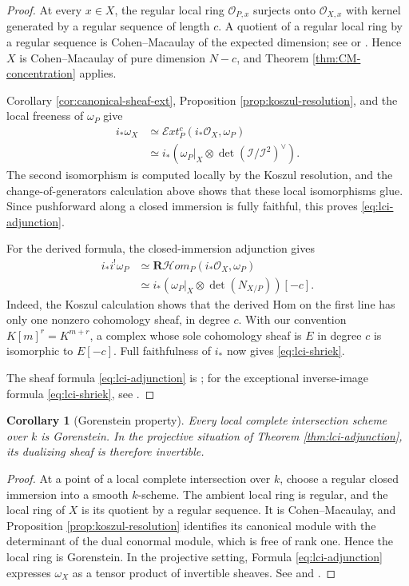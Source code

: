 \documentclass[11pt,a4paper]{article}
\newtheorem{corollary}[theorem]{Corollary}
\theoremstyle{definition}
\theoremstyle{remark}
\newcommand{\OO}{\mathcal O}
\newcommand{\II}{\mathcal I}
\newcommand{\shExt}{\mathcal E\!xt}
\newcommand{\RshHom}{\mathbf R\!\mathcal H\!om}
\newcommand{\dual}{^{\vee}}
\newcommand{\determinant}{\operatorname{det}}
\begin{document}
\begin{proof}
At every $x\in X$, the regular local ring $\OO_{P,x}$ surjects onto
$\OO_{X,x}$ with kernel generated by a regular sequence of length $c$. A
quotient of a regular local ring by a regular sequence is Cohen--Macaulay of
the expected dimension; see
\cite[Chapter II, Theorem 8.21A(a), (c), and (d)]{HartshorneAG} or
\cite[Theorem 2.1.3]{BrunsHerzog}. Hence $X$ is Cohen--Macaulay of pure
dimension $N-c$, and Theorem
\ref{thm:CM-concentration} applies.

Corollary \ref{cor:canonical-sheaf-ext}, Proposition
\ref{prop:koszul-resolution}, and the local freeness of $\omega_P$ give
\begin{align*}
  i_*\omega_X
  &\simeq\shExt_P^c(i_*\OO_X,\omega_P)\\
  &\simeq
  i_*\!\left(
    \omega_P|_X\otimes\determinant(\II/\II^2)\dual
  \right).
\end{align*}
The second isomorphism is computed locally by the Koszul resolution, and the
change-of-generators calculation above shows that these local isomorphisms
glue. Since pushforward along a closed immersion is fully faithful, this
proves \eqref{eq:lci-adjunction}.

For the derived formula, the closed-immersion adjunction gives
\begin{align*}
  i_*i^!\omega_P
  &\simeq\RshHom_P(i_*\OO_X,\omega_P)\\
  &\simeq
  i_*\!\left(
    \omega_P|_X\otimes\determinant(N_{X/P})
  \right)[-c].
\end{align*}
Indeed, the Koszul calculation shows that the derived Hom on the first line
has only one nonzero cohomology sheaf, in degree $c$. With our convention
$K[m]^r=K^{m+r}$, a complex whose sole cohomology sheaf is $E$ in degree $c$
is isomorphic to $E[-c]$. Full faithfulness of $i_*$ now gives
\eqref{eq:lci-shriek}.

The sheaf formula \eqref{eq:lci-adjunction} is
\cite[Chapter III, Theorem 7.11]{HartshorneAG}; for the exceptional
inverse-image formula \eqref{eq:lci-shriek}, see \cite[Tag 0BR0]{Stacks}.
\end{proof}

\begin{corollary}[Gorenstein property]
Every local complete intersection scheme over $k$ is Gorenstein. In the
projective situation of Theorem \ref{thm:lci-adjunction}, its dualizing sheaf
is therefore invertible.
\end{corollary}

\begin{proof}
At a point of a local complete intersection over $k$, choose a regular closed
immersion into a smooth $k$-scheme. The ambient local ring is regular, and the
local ring of $X$ is its quotient by a regular sequence. It is
Cohen--Macaulay, and Proposition \ref{prop:koszul-resolution} identifies its
canonical module with the determinant of the dual conormal module, which is
free of rank one. Hence the local ring is Gorenstein. In the projective
setting, Formula \eqref{eq:lci-adjunction} expresses $\omega_X$ as a tensor
product of invertible sheaves. See
\cite[Chapter III, Theorem 7.11]{HartshorneAG} and
\cite[Tag 0BVA]{Stacks}.
\end{proof}
\end{document}
